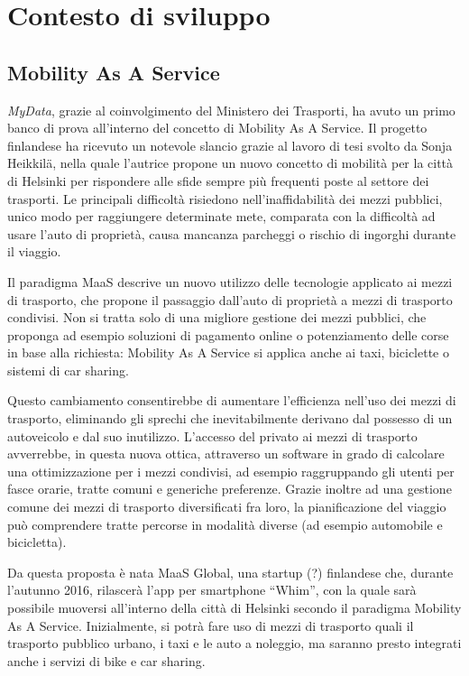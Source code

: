 \chapter{Contesto di sviluppo}
\label{capitolo2}
\thispagestyle{empty}

\cite{mydatawebsite}
\section{Mobility As A Service}
\textit{MyData}, grazie al coinvolgimento del Ministero dei Trasporti, ha avuto un primo banco di prova all’interno del concetto di Mobility As A Service. Il progetto finlandese ha ricevuto un notevole slancio grazie al lavoro di tesi svolto da Sonja Heikkil\"a\cite{mastersonjaheikkil}, nella quale l’autrice propone un nuovo concetto di mobilit\`a per la citt\`a di Helsinki per rispondere alle sfide sempre pi\`u frequenti poste al settore dei trasporti. Le principali difficolt\`a risiedono nell’inaffidabilit\`a dei mezzi pubblici, unico modo per raggiungere determinate mete, comparata con la difficolt\`a ad usare l’auto di propriet\`a, causa mancanza parcheggi o rischio di ingorghi durante il viaggio.

Il paradigma MaaS descrive un nuovo utilizzo delle tecnologie applicato ai mezzi di trasporto, che propone il passaggio dall’auto di propriet\`a a mezzi di trasporto condivisi. Non si tratta solo di una migliore gestione dei mezzi pubblici, che proponga ad esempio soluzioni di pagamento online o potenziamento delle corse in base alla richiesta: Mobility As A Service si applica anche ai taxi, biciclette o sistemi di car sharing. 

Questo cambiamento consentirebbe di aumentare l’efficienza nell’uso dei mezzi di trasporto, eliminando gli sprechi che inevitabilmente derivano dal possesso di un autoveicolo e dal suo inutilizzo. L’accesso del privato ai mezzi di trasporto avverrebbe, in questa nuova ottica, attraverso un software in grado di calcolare una ottimizzazione per i mezzi condivisi, ad esempio raggruppando gli utenti per fasce orarie, tratte comuni e generiche preferenze. Grazie inoltre ad una gestione comune dei mezzi di trasporto diversificati fra loro, la pianificazione del viaggio pu\`o comprendere tratte percorse in modalit\`a diverse (ad esempio automobile e bicicletta).

Da questa proposta \`e nata MaaS Global\cite{maasglobal}, una startup (?) finlandese che, durante l’autunno 2016, rilascer\`a l’app per smartphone “Whim”, con la quale sar\`a possibile muoversi all’interno della citt\`a di Helsinki secondo il paradigma Mobility As A Service. Inizialmente, si potr\`a fare uso di mezzi di trasporto quali il trasporto pubblico urbano, i taxi e le auto a noleggio, ma saranno presto integrati anche i servizi di bike e car sharing.

